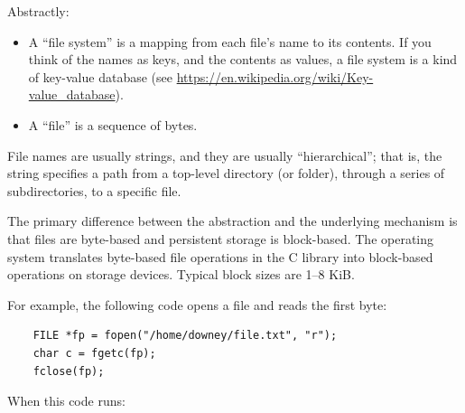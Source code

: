\documentclass[12pt]{book}
\begin{document}
Abstractly:

\begin{itemize}

\item A ``file system'' is a mapping from each file's name to its contents.
If you think of the names as keys, and the contents as values,
a file system is a kind of key-value database
(see \url{https://en.wikipedia.org/wiki/Key-value_database}).

\item A ``file'' is a sequence of bytes.

\end{itemize}

File names are usually strings, and they are usually ``hierarchical'';
that is, the string specifies a path from a top-level directory (or
folder), through a series of subdirectories, to a specific file.

The primary difference between the abstraction and the underlying
mechanism is that files are byte-based and persistent storage is
block-based.  The operating system translates byte-based file operations 
in the C library into block-based operations on storage devices.
Typical block sizes are 1--8 KiB.

For example, the following code opens a file and reads the first byte:

\begin{verbatim}
    FILE *fp = fopen("/home/downey/file.txt", "r");
    char c = fgetc(fp);
    fclose(fp);
\end{verbatim}

When this code runs:
\end{document}
